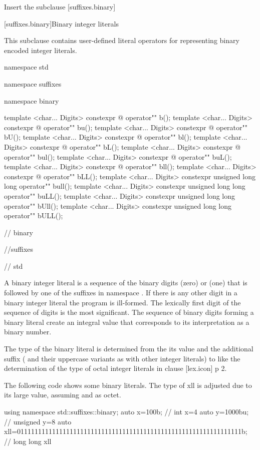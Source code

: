 \documentclass[ebook,11pt,article]{memoir}
\begin{document}
Insert the subclause [suffixes.binary]

[suffixes.binary]{Binary integer literals}

\pnum
This subclause contains user-defined literal operators for representing binary encoded integer literals.

\begin{codeblock}
namespace std{
namespace suffixes{
namespace binary{

template <char... Digits>
constexpr @\seebelow@ 
operator"" b();
template <char... Digits>
constexpr @\seebelow@ 
operator"" bu();
template <char... Digits>
constexpr @\seebelow@ 
operator"" bU();
template <char... Digits>
constexpr @\seebelow@ 
operator"" bl();
template <char... Digits>
constexpr @\seebelow@ 
operator"" bL();
template <char... Digits>
constexpr @\seebelow@ 
operator"" bul();
template <char... Digits>
constexpr @\seebelow@ 
operator"" buL();
template <char... Digits>
constexpr @\seebelow@ 
operator"" bll();
template <char... Digits>
constexpr @\seebelow@ 
operator"" bLL();
template <char... Digits>
constexpr unsigned long long
operator"" bull();
template <char... Digits>
constexpr unsigned long long
operator"" buLL();
template <char... Digits>
constexpr unsigned long long
operator"" bUll();
template <char... Digits>
constexpr unsigned long long
operator"" bULL();
} // binary
} //suffixes
} // std
\end{codeblock}

\pnum
A binary integer literal is a sequence of the binary digits  (zero) or  (one) that is followed by one of the suffixes in namespace . If there is any other digit in a binary integer literal the program is ill-formed. The lexically first digit of the sequence of digits is the most significant. The sequence of binary digits forming a binary literal create an integral value that corresponds to its interpretation as a binary number.

\pnum
The type of the binary literal is determined from the its value and the additional suffix ( and their uppercase variants as with other integer literals) to  like the determination of the type of octal integer literals in clause [lex.icon] p 2.

\pnum
\enterexample 
The following code shows some binary literals. The type of xll is adjusted due to its large value, assuming  and  as octet.
\begin{codeblock}
{
    using namespace std::suffixes::binary;
    auto x=100b; // int x=4
    auto y=1000bu; // unsigned y=8
    auto xll=0111111111111111111111111111111111111111111111111111111111111111b;
         // long long xll
}
\end{codeblock}
\exitexample
\end{document}
